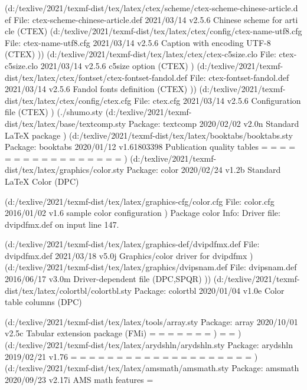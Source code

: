 (d:/texlive/2021/texmf-dist/tex/latex/ctex/scheme/ctex-scheme-chinese-article.d
ef
File: ctex-scheme-chinese-article.def 2021/03/14 v2.5.6 Chinese scheme for arti
cle (CTEX)
 (d:/texlive/2021/texmf-dist/tex/latex/ctex/config/ctex-name-utf8.cfg
File: ctex-name-utf8.cfg 2021/03/14 v2.5.6 Caption with encoding UTF-8 (CTEX)
))
(d:/texlive/2021/texmf-dist/tex/latex/ctex/ctex-c5size.clo
File: ctex-c5size.clo 2021/03/14 v2.5.6 c5size option (CTEX)
)
(d:/texlive/2021/texmf-dist/tex/latex/ctex/fontset/ctex-fontset-fandol.def
File: ctex-fontset-fandol.def 2021/03/14 v2.5.6 Fandol fonts definition (CTEX)
))
(d:/texlive/2021/texmf-dist/tex/latex/ctex/config/ctex.cfg
File: ctex.cfg 2021/03/14 v2.5.6 Configuration file (CTEX)
) (./shumo.sty
(d:/texlive/2021/texmf-dist/tex/latex/base/textcomp.sty
Package: textcomp 2020/02/02 v2.0n Standard LaTeX package
)
(d:/texlive/2021/texmf-dist/tex/latex/booktabs/booktabs.sty
Package: booktabs 2020/01/12 v1.61803398 Publication quality tables
\heavyrulewidth=
\lightrulewidth=
\cmidrulewidth=
\belowrulesep=
\belowbottomsep=
\aboverulesep=
\abovetopsep=
\cmidrulesep=
\cmidrulekern=
=
\@cmidla=
\@cmidlb=
\@aboverulesep=
\@belowrulesep=
\@thisruleclass=
\@lastruleclass=
\@thisrulewidth=
)
(d:/texlive/2021/texmf-dist/tex/latex/graphics/color.sty
Package: color 2020/02/24 v1.2b Standard LaTeX Color (DPC)

(d:/texlive/2021/texmf-dist/tex/latex/graphics-cfg/color.cfg
File: color.cfg 2016/01/02 v1.6 sample color configuration
)
Package color Info: Driver file: dvipdfmx.def on input line 147.

(d:/texlive/2021/texmf-dist/tex/latex/graphics-def/dvipdfmx.def
File: dvipdfmx.def 2021/03/18 v5.0j Graphics/color driver for dvipdfmx
)
(d:/texlive/2021/texmf-dist/tex/latex/graphics/dvipsnam.def
File: dvipsnam.def 2016/06/17 v3.0m Driver-dependent file (DPC,SPQR)
))
(d:/texlive/2021/texmf-dist/tex/latex/colortbl/colortbl.sty
Package: colortbl 2020/01/04 v1.0e Color table columns (DPC)

(d:/texlive/2021/texmf-dist/tex/latex/tools/array.sty
Package: array 2020/10/01 v2.5c Tabular extension package (FMi)
\col@sep=
\ar@mcellbox=
\extrarowheight=
\NC@list=
\extratabsurround=
\backup@length=
\ar@cellbox=
)
\everycr=
\minrowclearance=
)
(d:/texlive/2021/texmf-dist/tex/latex/arydshln/arydshln.sty
Package: arydshln 2019/02/21 v1.76 
\dashlinedash=
\dashlinegap=
\adl@box=
\adl@height=
\adl@heightsave=
\adl@depth=
\adl@depthsave=
\adl@finaldepth=
\adl@columns=
\adl@ncol=
\adl@currentcolumn=
\adl@currentcolumnsave=
\adl@totalheight=
\adl@totalheightsave=
\adl@dash=
\adl@gap=
\adl@cla=
\adl@clb=
\adl@everyvbox=
\adl@LTpagetotal=
)
(d:/texlive/2021/texmf-dist/tex/latex/amsmath/amsmath.sty
Package: amsmath 2020/09/23 v2.17i AMS math features
\@mathmargin=


